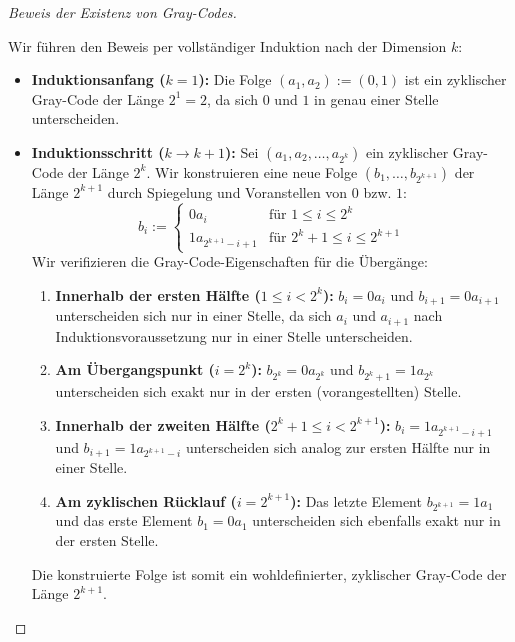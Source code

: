 \begin{proof}[Beweis der Existenz von Gray-Codes]
\begin{math-stroke}
Wir führen den Beweis per vollständiger Induktion nach der Dimension $k$:
\begin{itemize}
    \item \textbf{Induktionsanfang ($k=1$):} Die Folge $(a_1, a_2) := (0, 1)$ ist ein zyklischer Gray-Code der Länge $2^1 = 2$, da sich $0$ und $1$ in genau einer Stelle unterscheiden.
    \item \textbf{Induktionsschritt ($k \to k+1$):} Sei $(a_1, a_2, \dots, a_{2^k})$ ein zyklischer Gray-Code der Länge $2^k$. Wir konstruieren eine neue Folge $(b_1, \dots, b_{2^{k+1}})$ der Länge $2^{k+1}$ durch Spiegelung und Voranstellen von $0$ bzw. $1$:
    \[
    b_i := \begin{cases}
    0a_i & \text{für } 1 \le i \le 2^k \\
    1a_{2^{k+1} - i + 1} & \text{für } 2^k + 1 \le i \le 2^{k+1}
    \end{cases}
    \]
    Wir verifizieren die Gray-Code-Eigenschaften für die Übergänge:
    \begin{enumerate}[label=\textbf{\arabic*.}]
        \item \textbf{Innerhalb der ersten Hälfte ($1 \le i < 2^k$):} $b_i = 0a_i$ und $b_{i+1} = 0a_{i+1}$ unterscheiden sich nur in einer Stelle, da sich $a_i$ und $a_{i+1}$ nach Induktionsvoraussetzung nur in einer Stelle unterscheiden.
        \item \textbf{Am Übergangspunkt ($i = 2^k$):} $b_{2^k} = 0a_{2^k}$ und $b_{2^k+1} = 1a_{2^k}$ unterscheiden sich exakt nur in der ersten (vorangestellten) Stelle.
        \item \textbf{Innerhalb der zweiten Hälfte ($2^k + 1 \le i < 2^{k+1}$):} $b_i = 1a_{2^{k+1}-i+1}$ und $b_{i+1} = 1a_{2^{k+1}-i}$ unterscheiden sich analog zur ersten Hälfte nur in einer Stelle.
        \item \textbf{Am zyklischen Rücklauf ($i = 2^{k+1}$):} Das letzte Element $b_{2^{k+1}} = 1a_1$ und das erste Element $b_1 = 0a_1$ unterscheiden sich ebenfalls exakt nur in der ersten Stelle.
    \end{enumerate}
    Die konstruierte Folge ist somit ein wohldefinierter, zyklischer Gray-Code der Länge $2^{k+1}$.
\end{itemize}
\end{math-stroke}
\end{proof}

